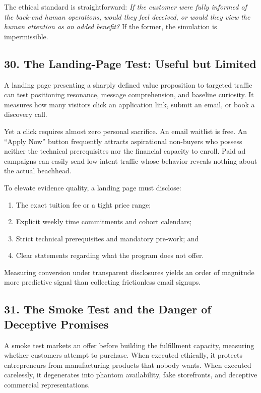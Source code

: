 The ethical standard is straightforward: \emph{If the customer were fully informed of the back-end human operations, would they feel deceived, or would they view the human attention as an added benefit?} If the former, the simulation is impermissible.

\subsection*{30. The Landing-Page Test: Useful but Limited}

A landing page presenting a sharply defined value proposition to targeted traffic can test positioning resonance, message comprehension, and baseline curiosity. It measures how many visitors click an application link, submit an email, or book a discovery call.

Yet a click requires almost zero personal sacrifice. An email waitlist is free. An ``Apply Now'' button frequently attracts aspirational non-buyers who possess neither the technical prerequisites nor the financial capacity to enroll. Paid ad campaigns can easily send low-intent traffic whose behavior reveals nothing about the actual beachhead.

To elevate evidence quality, a landing page must disclose:
\begin{enumerate}
    \item The exact tuition fee or a tight price range;
    \item Explicit weekly time commitments and cohort calendars;
    \item Strict technical prerequisites and mandatory pre-work; and
    \item Clear statements regarding what the program does not offer.
\end{enumerate}

Measuring conversion under transparent disclosures yields an order of magnitude more predictive signal than collecting frictionless email signups.

\subsection*{31. The Smoke Test and the Danger of Deceptive Promises}

A smoke test markets an offer before building the fulfillment capacity, measuring whether customers attempt to purchase. When executed ethically, it protects entrepreneurs from manufacturing products that nobody wants. When executed carelessly, it degenerates into phantom availability, fake storefronts, and deceptive commercial representations.

